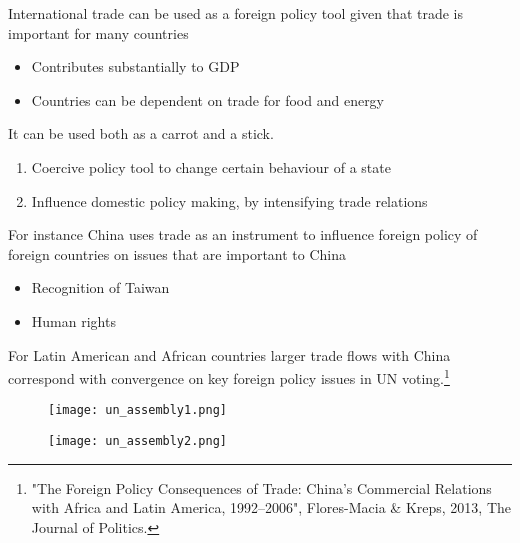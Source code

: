 \documentclass{beamer}
\begin{document}
\begin{frame}
  International trade can be used as a foreign policy tool given that trade is important for many countries
  \begin{itemize}
    \item Contributes substantially to GDP
    \item Countries can be dependent on trade for food and energy
  \end{itemize}
  \medskip
  It can be used both as a carrot and a stick.
  \begin{enumerate}
    \item Coercive policy tool to change certain behaviour of a state
    \item Influence domestic policy making, by intensifying trade relations    
  \end{enumerate}
\end{frame}

\begin{frame}
 For instance China uses trade as an instrument to influence foreign policy of foreign countries on issues that are important to China
 \begin{itemize}
   \item Recognition of Taiwan
   \item Human rights
 \end{itemize}
 \medskip
 For Latin American and African countries larger trade flows with China correspond with convergence on key foreign policy issues in UN voting.\footnote{"The Foreign Policy Consequences of Trade: China’s Commercial Relations with Africa and Latin America, 1992–2006", Flores-Macia \& Kreps, 2013, The Journal of Politics.}  
\end{frame}

\begin{frame}
  \begin{figure}
    \texttt{[image: un\_assembly1.png]}
  \end{figure}  
\end{frame}

\begin{frame}
  \begin{figure}
    \texttt{[image: un\_assembly2.png]}
  \end{figure}  
\end{frame}
\end{document}
